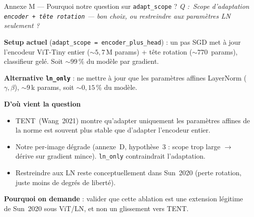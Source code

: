 \documentclass[10pt,aspectratio=169]{beamer}
\newcommand{\code}[1]{\texttt{\small #1}}
\newcommand{\backupend}{%
  \setcounter{framenumber}{\value{finalframe}}%
}
\newcommand{\qbox}[1]{\textit{\textcolor{accent}{Q : #1}}\par\smallskip}
\begin{document}
\begin{frame}{Annexe M --- Pourquoi notre question sur \code{adapt\_scope} ?}
  \qbox{\guillemotleft\,Scope d'adaptation \code{encoder + tête rotation} --- bon choix, ou restreindre aux paramètres LN seulement ?\,\guillemotright{}}

  \textbf{Setup actuel} (\code{adapt\_scope = encoder\_plus\_head}) : un pas SGD met à jour l'encodeur ViT-Tiny entier ($\sim 5{,}7$\,M params) + tête rotation ($\sim 770$~params), classifieur gelé. Soit \alert{$\sim 99\,\%$ du modèle} par gradient.

  \textbf{Alternative \code{ln\_only}} : ne mettre à jour que les paramètres affines LayerNorm ($\gamma, \beta$), $\sim 9$\,k params, soit \alert{$\sim 0{,}15\,\%$ du modèle}.

  \textbf{D'où vient la question}
  \begin{itemize}\small
    \item TENT~(Wang~2021) montre qu'adapter uniquement les paramètres affines de la norme est souvent plus stable que d'adapter l'encodeur entier.
    \item Notre per-image dégrade (annexe~D, hypothèse~3 : scope trop large $\to$ dérive sur gradient mince). \code{ln\_only} contraindrait l'adaptation.
    \item Restreindre aux LN reste conceptuellement dans Sun~2020 (perte rotation, juste moins de degrés de liberté).
  \end{itemize}

  \textbf{Pourquoi on demande} : valider que cette ablation est une extension légitime de Sun~2020 sous ViT/LN, et non un glissement vers TENT.
\end{frame}

\backupend
\end{document}
